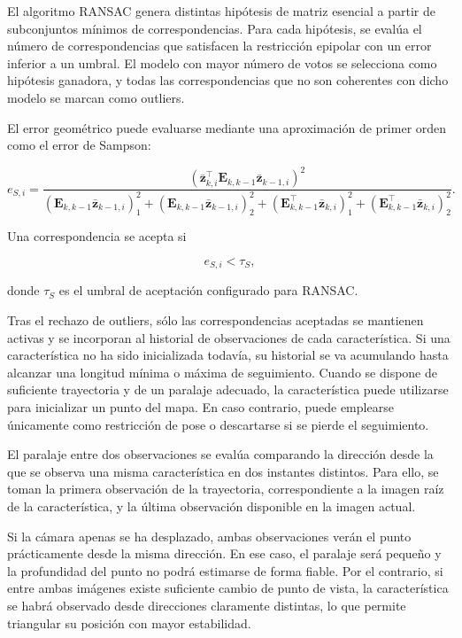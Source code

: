 El algoritmo RANSAC genera distintas hipótesis de matriz esencial a partir de subconjuntos
mínimos de correspondencias. Para cada hipótesis, se evalúa el número de correspondencias
que satisfacen la restricción epipolar con un error inferior a un umbral. El modelo con
mayor número de votos se selecciona como hipótesis ganadora, y todas las correspondencias
que no son coherentes con dicho modelo se marcan como outliers.

El error geométrico puede evaluarse mediante una aproximación de primer orden como el error de Sampson:

\[
e_{S,i}
=
\frac{
\left(
\bar{\mathbf{z}}_{k,i}^\top
\mathbf{E}_{k,k-1}
\bar{\mathbf{z}}_{k-1,i}
\right)^2
}{
(\mathbf{E}_{k,k-1}\bar{\mathbf{z}}_{k-1,i})_1^2
+
(\mathbf{E}_{k,k-1}\bar{\mathbf{z}}_{k-1,i})_2^2
+
(\mathbf{E}_{k,k-1}^\top\bar{\mathbf{z}}_{k,i})_1^2
+
(\mathbf{E}_{k,k-1}^\top\bar{\mathbf{z}}_{k,i})_2^2
}.
\]

Una correspondencia se acepta si

\[
e_{S,i} < \tau_S,
\]

donde $\tau_S$ es el umbral de aceptación configurado para RANSAC.

Tras el rechazo de outliers, sólo las correspondencias aceptadas se mantienen activas y se
incorporan al historial de observaciones de cada característica. Si una característica no
ha sido inicializada todavía, su historial se va acumulando hasta alcanzar una longitud
mínima o máxima de seguimiento. Cuando se dispone de suficiente trayectoria y de un
paralaje adecuado, la característica puede utilizarse para inicializar un punto del mapa.
En caso contrario, puede emplearse únicamente como restricción de pose o descartarse si se
pierde el seguimiento.

El paralaje entre dos observaciones se evalúa comparando la dirección desde la que se observa una misma característica en dos 
instantes distintos. Para ello, se toman la primera observación de la trayectoria, correspondiente a la imagen raíz de la 
característica, y la última observación disponible en la imagen actual.

Si la cámara apenas se ha desplazado, ambas observaciones verán el punto prácticamente desde la misma dirección. En ese caso, el 
paralaje será pequeño y la profundidad del punto no podrá estimarse de forma fiable. Por el contrario, si entre ambas imágenes existe 
suficiente cambio de punto de vista, la característica se habrá observado desde direcciones claramente distintas, lo que permite 
triangular su posición con mayor estabilidad.

